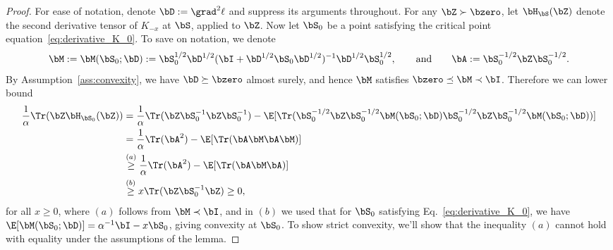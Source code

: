 \begin{proof}
%
For ease of notation, denote $\bD :=  \grad^2\ell$ and suppress its arguments throughout.
 For any $\bZ\succ\bzero$, let $\bH_\bS(\bZ)$ denote the second derivative tensor of $K_{-x}$ at $\bS$, applied to $\bZ$.
Now let $\bS_0$ be a point satisfying the critical point equation~\eqref{eq:derivative_K_0}.
To save on notation,  we denote
\begin{equation}
   \bM := \bM(\bS_0;\bD):=  \bS_0^{1/2}\bD^{1/2}(\bI+\bD^{1/2} \bS_0\bD^{1/2})^{-1} \bD^{1/2}\bS_0^{1/2},\quad\quad\textrm{and}\quad\quad
   \bA := \bS_0^{-1/2}\bZ\bS_{0}^{-1/2}.
\end{equation}
By Assumption~\ref{ass:convexity}, we have $\bD \succeq \bzero$ almost surely, and hence $\bM$ satisfies  $\bzero \preceq \bM \prec\bI$.
Therefore we can lower bound
\begin{align}
\label{eq:second_derivative_K_0}
  \frac1\alpha\Tr( \bZ \bH_{\bS_0}( \bZ)) &= \frac1\alpha\Tr(\bZ \bS_0^{-1} \bZ \bS_0^{-1}) - 
  \E[
\Tr(\bS_0^{-1/2}\bZ \bS_0^{-1/2}\bM(\bS_0;\bD) \bS_0^{-1/2}\bZ\bS_0^{-1/2}\bM(\bS_0;\bD) )]\\
&= \frac1\alpha \Tr(\bA^2) - \E[\Tr(\bA\bM\bA\bM)]\\
&\stackrel{(a)}{\ge} \frac1\alpha \Tr(\bA^2) - \E[\Tr(\bA\bM\bA)]\\
 &\stackrel{(b)}{\ge} x  \Tr(\bZ\bS_0^{-1} \bZ) \ge 0,
\end{align}
for all $x\ge0$,
where $(a)$ follows from $\bM\prec\bI$, and in $(b)$ we used that
for $\bS_0$ satisfying Eq.~\eqref{eq:derivative_K_0}, we have 
$\E[\bM(\bS_0;\bD)] = \alpha^{-1}\bI   - x\bS_0$, giving 
convexity at $\bS_0$. To show strict convexity, we'll show that the inequality $(a)$ cannot hold with equality under the assumptions of the lemma.


\end{proof}
